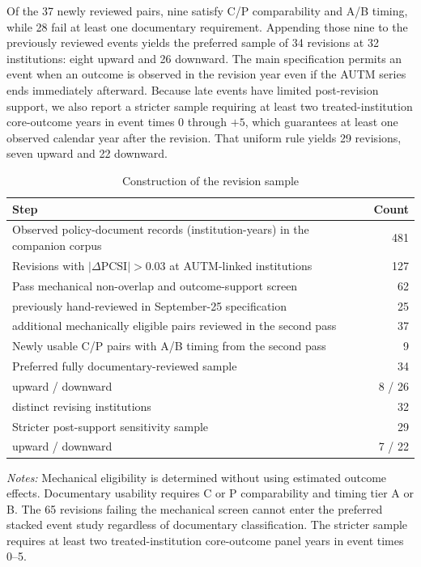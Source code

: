 Of the 37 newly reviewed pairs, nine satisfy C/P comparability and A/B timing, while 28 fail at least one documentary requirement. Appending those nine to the previously reviewed events yields the preferred sample of 34 revisions at 32 institutions: eight upward and 26 downward. The main specification permits an event when an outcome is observed in the revision year even if the AUTM series ends immediately afterward. Because late events have limited post-revision support, we also report a stricter sample requiring at least two treated-institution core-outcome years in event times 0 through $+5$, which guarantees at least one observed calendar year after the revision. That uniform rule yields 29 revisions, seven upward and 22 downward.

\begin{table}[htbp]\centering
\caption{Construction of the revision sample}\label{tab:revsample}
\begin{threeparttable}\small
\begin{tabular}{p{11.3cm}r}\toprule
Step & Count \\\midrule
Observed policy-document records (institution-years) in the companion corpus & 481 \\
Revisions with $|\Delta\mathrm{PCSI}|>0.03$ at AUTM-linked institutions & 127 \\
Pass mechanical non-overlap and outcome-support screen & 62 \\
\quad previously hand-reviewed in September-25 specification & 25 \\
\quad additional mechanically eligible pairs reviewed in the second pass & 37 \\
Newly usable C/P pairs with A/B timing from the second pass & 9 \\
Preferred fully documentary-reviewed sample & 34 \\
\quad upward / downward & 8 / 26 \\
\quad distinct revising institutions & 32 \\
Stricter post-support sensitivity sample & 29 \\
\quad upward / downward & 7 / 22 \\
\bottomrule
\end{tabular}
\begin{tablenotes}[flushleft]\footnotesize
\item \textit{Notes:} Mechanical eligibility is determined without using estimated outcome effects. Documentary usability requires C or P comparability and timing tier A or B. The 65 revisions failing the mechanical screen cannot enter the preferred stacked event study regardless of documentary classification. The stricter sample requires at least two treated-institution core-outcome panel years in event times 0--5.
\end{tablenotes}
\end{threeparttable}
\end{table}
